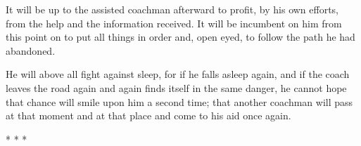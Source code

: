 It will be up to the assisted coachman afterward to profit, by his own efforts, from the help and the information received. It will be incumbent on him from this point on to put all things in order and, open eyed, to follow the path he had abandoned.

He will above all fight against sleep, for if he falls asleep again, and if the coach leaves the road again and again finds itself in the same danger, he cannot hope that chance will smile upon him a second time; that another coachman will pass at that moment and at that place and come to his aid once again.





\begin{center}* * *\end{center}

